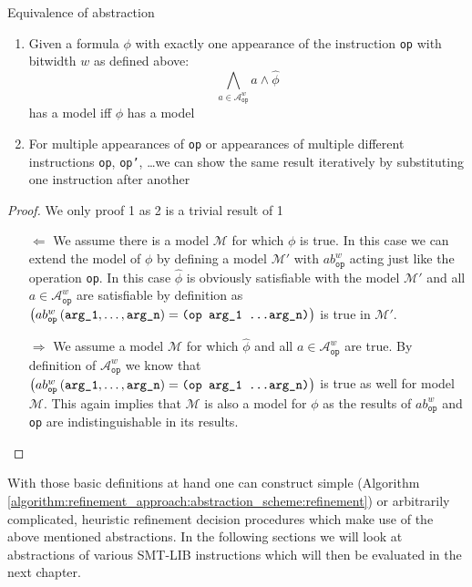 \begin{lemma} Equivalence of abstraction
\label{lemma:refinement_approach:abstraction_scheme:equivalence}
\begin{enumerate}
    \item \label{lemma:refinement_approach:abstraction_scheme:equivalence:1} Given a formula $\phi$ with exactly one appearance of the instruction \texttt{op} with bitwidth $w$ as defined above:
    \[
        \bigwedge\limits_{a\in\mathcal{A}_\texttt{op}^w} a \land \hat{\phi}
    \]
    has a model iff $\phi$ has a model
    \item For multiple appearances of \texttt{op} or appearances of multiple different instructions \texttt{op}, \texttt{op'}, \dots we can show the same result iteratively by substituting one instruction after another
\end{enumerate}
\begin{proof}
We only proof 1 as 2 is a trivial result of 1
\begin{itemize}
    \item[$\Leftarrow$]
    We assume there is a model $\mathcal{M}$ for which $\phi$ is true. In this case we can extend the model of $\phi$ by defining a model $\mathcal{M}'$ with $ab_\texttt{op}^w$ acting just like the operation \texttt{op}. In this case $\hat{\phi}$ is obviously satisfiable with the model $\mathcal{M}'$ and all $a \in \mathcal{A}_\texttt{op}^w$ are satisfiable by definition as $\left( ab_{\texttt{op}}^w\left(\texttt{arg\_1}, \dots, \texttt{arg\_n}\right)=\texttt{(op arg\_1 \dots arg\_n)} \right)$ is true in $\mathcal{M}'$.
    \item[$\Rightarrow$]
    We assume a model $\mathcal{M}$ for which $\hat{\phi}$ and all $a \in \mathcal{A}_\texttt{op}^w$ are true.
    By definition of $\mathcal{A}_\texttt{op}^w$ we know that $\left( ab_{\texttt{op}}^w\left(\texttt{arg\_1}, \dots, \texttt{arg\_n}\right)=\texttt{(op arg\_1 \dots arg\_n)} \right)$ is true as well for model $\mathcal{M}$.
    This again implies that $\mathcal{M}$ is also a model for $\phi$ as the results of $ab_\texttt{op}^w$ and \texttt{op} are indistinguishable in its results.
\end{itemize}
\end{proof}
\end{lemma}

With those basic definitions at hand one can construct simple (Algorithm \ref{algorithm:refinement_approach:abstraction_scheme:refinement}) or arbitrarily complicated, heuristic  refinement decision procedures which make use of the above mentioned abstractions. In the following sections we will look at abstractions of various SMT-LIB instructions which will then be evaluated in the next chapter.

